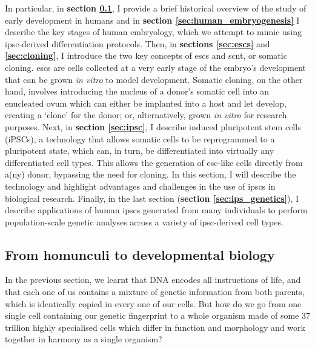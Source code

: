 In particular, in \textbf{section \ref{sec:history_developmental_biology}}, I provide a brief historical overview of the study of early development in humans and in \textbf{section \ref{sec:human_embryogenesis}} I describe the key stages of human embryology, which we attempt to mimic using \gls{ipsc}-derived differentiation protocols.
Then, in \textbf{sections \ref{sec:escs}} and \textbf{\ref{sec:cloning}}, I introduce the two key concepts of \glspl{esc} and \gls{scnt}, or somatic cloning.
\glspl{esc} are cells collected at a very early stage of the embryo's development that can be grown \textit{in vitro} to model development.
Somatic cloning, on the other hand, involves introducing the nucleus of a donor's somatic cell into an enucleated ovum which can either be implanted into a host and let develop, creating a `clone' for the donor; or, alternatively, grown \textit{in vitro} for research purposes.
Next, in \textbf{section \ref{sec:ipsc}}, I describe induced pluripotent stem cells (iPSCs), a technology that allows somatic cells to be reprogrammed to a pluripotent state, which can, in turn, be differentiated into virtually any differentiated cell types.
This allows the generation of \gls{esc}-like cells directly from a(ny) donor, bypassing the need for cloning. 
In this section, I will describe the technology and highlight advantages and challenges in the use of \glspl{ipsc} in biological research.
Finally, in the last section (\textbf{section \ref{sec:ips_genetics}}), I describe 
applications of human \glspl{ipsc} generated from many individuals to perform population-scale genetic analyses across a variety of \gls{ipsc}-derived cell types.

\newpage

\subsection{From homunculi to developmental biology}
\label{sec:history_developmental_biology}

In the previous section, we learnt that DNA encodes all instructions of life, and that each one of us contains a mixture of genetic information from both parents, which is identically copied in every one of our cells.
But how do we go from one single cell containing our genetic fingerprint to a whole organism made of some 37 trillion highly specialised cells which differ in function and morphology and work together in harmony as a single organism?\\

